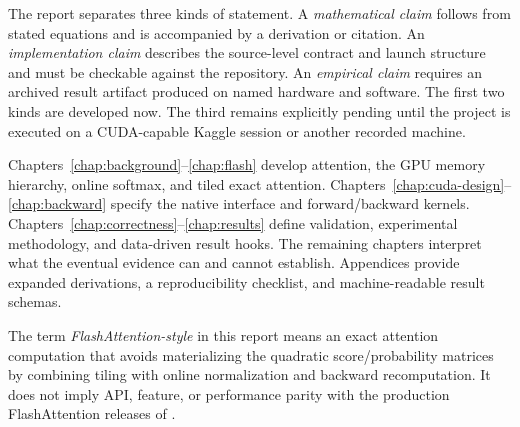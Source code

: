 The report separates three kinds of statement. A \emph{mathematical claim} follows from stated equations and is accompanied by a derivation or citation. An \emph{implementation claim} describes the source-level contract and launch structure and must be checkable against the repository. An \emph{empirical claim} requires an archived result artifact produced on named hardware and software. The first two kinds are developed now. The third remains explicitly pending until the project is executed on a CUDA-capable Kaggle session or another recorded machine.

Chapters~\ref{chap:background}--\ref{chap:flash} develop attention, the GPU memory hierarchy, online softmax, and tiled exact attention. Chapters~\ref{chap:cuda-design}--\ref{chap:backward} specify the native interface and forward/backward kernels. Chapters~\ref{chap:correctness}--\ref{chap:results} define validation, experimental methodology, and data-driven result hooks. The remaining chapters interpret what the eventual evidence can and cannot establish. Appendices provide expanded derivations, a reproducibility checklist, and machine-readable result schemas.

\begin{scopebox}
The term \emph{FlashAttention-style} in this report means an exact attention computation that avoids materializing the quadratic score/probability matrices by combining tiling with online normalization and backward recomputation. It does not imply API, feature, or performance parity with the production FlashAttention releases of \citet{dao2022flashattention,dao2024flashattention2,shah2024flashattention3}.
\end{scopebox}

